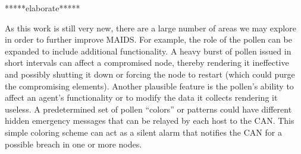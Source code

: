 \documentclass{acm_proc_article-sp}
\begin{document}
*****elaborate*****

As this work is still very new, there are a large number of areas we may explore in order to further improve MAIDS.  For example, the role of the pollen can be expanded to include additional functionality.  A heavy burst of pollen issued in short intervals can affect a compromised node, thereby rendering it ineffective and possibly shutting it down or forcing the node to restart (which could purge the compromising elements).  Another plausible feature is the pollen's ability to affect an agent's functionality or to modify the data it collects rendering it useless.  A predetermined set of pollen ``colors'' or patterns could have different hidden emergency messages that can be relayed by each host to the CAN.  This simple coloring scheme can act as a silent alarm that notifies the CAN for a possible breach in one or more nodes.

\nocite{*}


\balancecolumns
\end{document}
